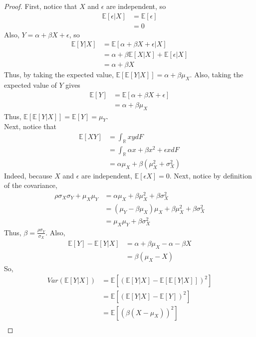 \documentclass{article}
\theoremstyle{definition}\newtheorem{definition}{DEF}
\theoremstyle{lemma}\newtheorem{lemma}{Lemma}
\theoremstyle{corrolary}\newtheorem{corrolary}{Cor}
\begin{document}
\begin{proof}
First, notice that $X$ and $\epsilon$ are independent, so
\begin{align*}
\mathbb{E}[\epsilon|X]&=\mathbb{E}[\epsilon]\\
&=0
\end{align*}
Also, $Y=\alpha + \beta X + \epsilon$, so
\begin{align*}
\mathbb{E}[Y|X]&=\mathbb{E}[\alpha +\beta X +\epsilon|X]\\
&=\alpha + \beta \mathbb{E}[X|X] + \mathbb{E}[\epsilon|X]\\
&= \alpha + \beta X
\end{align*}
Thus, by taking the expected value, $\mathbb{E}[\mathbb{E}[Y|X]]=\alpha + \beta \mu_X$.
Also, taking the expected value of $Y$ gives
\begin{align*}
\mathbb{E}[Y]&=\mathbb{E}[\alpha +\beta X +\epsilon]\\
&=\alpha + \beta \mu_X
\end{align*}
Thus, $\mathbb{E}[\mathbb{E}[Y|X]]=\mathbb{E}[Y]=\mu_Y$.\\
Next, notice that
\begin{align*}
\mathbb{E}[XY]&=\int_\mathbb{R} xy dF\\
&= \int_\mathbb{R} \alpha x +\beta x^2 +\epsilon x dF\\
&=\alpha \mu_X + \beta (\mu_X^2 + \sigma_X^2)
\end{align*}
Indeed, because $X$ and $\epsilon$ are independent, $\mathbb{E}[\epsilon X]=0$.
Next, notice by definition of the covariance,
\begin{align*}
\rho \sigma_X \sigma_Y + \mu_X \mu_Y &= \alpha \mu_X + \beta \mu_X^2 + \beta \sigma_X^2\\
&= (\mu_Y -\beta \mu_X) \mu_X + \beta \mu_X^2 +\beta \sigma_X^2\\
&= \mu_X \mu_Y + \beta \sigma_X^2
\end{align*}
Thus, $\beta =\frac{\rho \sigma_Y}{\sigma_X}$.
Also,
\begin{align*}
\mathbb{E}[Y] - \mathbb{E}[Y|X] &= \alpha + \beta \mu_X - \alpha -\beta X\\
&= \beta (\mu_X -X)
\end{align*}
So,
\begin{align*}
Var(\mathbb{E}[Y|X])&=\mathbb{E}[(\mathbb{E}[Y|X]-\mathbb{E}[\mathbb{E}[Y|X]])^2]\\
&=\mathbb{E}[(\mathbb{E}[Y|X]-\mathbb{E}[Y])^2]\\
&=\mathbb{E}[(\beta (X-\mu_X ))^2]\\

\end{align*}
\end{proof}
\end{document}
